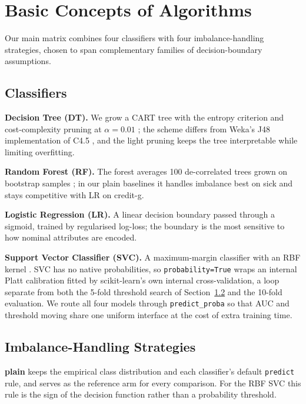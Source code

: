 \section{Basic Concepts of Algorithms}
\label{sec:algorithms}

Our main matrix combines four classifiers with four imbalance-handling
strategies, chosen to span complementary families of decision-boundary
assumptions.

\subsection{Classifiers}
\textbf{Decision Tree (DT).} We grow a CART tree with the entropy
criterion and cost-complexity pruning at $\alpha=0.01$
\cite{breiman1984classification}; the scheme differs from Weka's J48
implementation of C4.5 \cite{quinlan1993c45,frank2016weka}, and the
light pruning keeps the tree interpretable while limiting overfitting.

\textbf{Random Forest (RF).} The forest averages 100 de-correlated
trees grown on bootstrap samples \cite{breiman2001random}; in our
plain baselines it handles imbalance best on sick and stays
competitive with LR on credit-g.

\textbf{Logistic Regression (LR).} A linear decision boundary passed
through a sigmoid, trained by regularised log-loss; the boundary is
the most sensitive to how nominal attributes are encoded.

\textbf{Support Vector Classifier (SVC).} A maximum-margin classifier
with an RBF kernel \cite{cortes1995support}. SVC has no native
probabilities, so \texttt{probability=True} wraps an internal Platt
calibration \cite{platt1999probabilistic} fitted by scikit-learn's own
internal cross-validation, a loop separate from both the 5-fold
threshold search of Section~\ref{ssec:strategies} and the 10-fold
evaluation. We route all four models through \texttt{predict\_proba}
so that AUC and threshold moving share one uniform interface at the
cost of extra training time.

\subsection{Imbalance-Handling Strategies}
\label{ssec:strategies}
\textbf{plain} keeps the empirical class distribution and each
classifier's default \texttt{predict} rule, and serves as the
reference arm for every comparison. For the RBF SVC this rule is the
sign of the decision function rather than a probability threshold.

